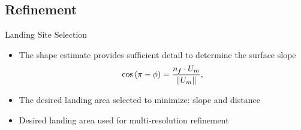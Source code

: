 \subsection{Refinement}
\begin{frame}{Landing Site Selection}
    \begin{itemize}
        \item The shape estimate provides sufficient detail to determine the surface slope
            \begin{align*}
                \cos \left(  \pi - \phi  \right) = \frac{n_f \cdot U_m}{\left\| U_m \right\|},
            \end{align*}
        \item The desired landing area selected to minimize: slope and distance
        \item Desired landing area used for multi-resolution refinement
    \end{itemize}
    \begin{center}
\end{center}
\end{frame}
